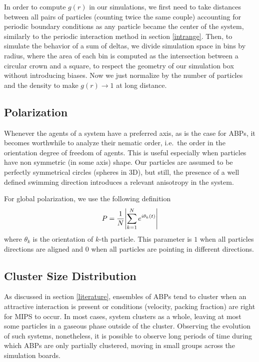 \documentclass[../../master_thesis_np.tex]{subfiles}
\begin{document}
		In order to compute $g(r)$ in our simulations, we first need to take distances between all pairs of particles (counting twice the same couple) accounting for periodic boundary conditions as any particle became the center of the system, similarly to the periodic interaction method in section \ref{intrange}. Then, to simulate the behavior of a sum of deltas, we divide simulation space in bins by radius, where the area of each bin is computed as the intersection between a circular crown and a square, to respect the geometry of our simulation box without introducing biases. Now we just normalize by the number of particles and the density to make $g(r) \to 1$ at long distance.
		
		\subsection{Polarization}
		Whenever the agents of a system have a preferred axis, as is the case for ABPs, it becomes worthwhile to analyze their nematic order, i.e.\ the order in the orientation degree of freedom of agents. This is useful especially when particles have non symmetric (in some axis) shape. Our particles are assumed to be perfectly symmetrical circles (spheres in 3D), but still, the presence of a well defined swimming direction introduces a relevant anisotropy in the system. 
		
		For global polarization, we use the following definition
		\begin{equation}
			P = \frac{1}{N} \abs{\sum_{k=1}^{N} e^{i \theta_k(t)}} 
		\end{equation}
		where $\theta_k$ is the orientation of $k$-th particle. This parameter is $1$ when all particles directions are aligned and $0$ when all particles are pointing in different directions. 
		
		\subsection{Cluster Size Distribution}
		As discussed in section \ref{literature}, ensembles of ABPs tend to cluster when an attractive interaction is present or conditions (velocity, packing fraction) are right for MIPS to occur. In most cases, system clusters as a whole, leaving at most some particles in a gaseous phase outside of the cluster. Observing the evolution of such systems, nonetheless, it is possible to observe long periods of time during which ABPs are only partially clustered, moving in small groups across the simulation boards. 
		
\end{document}
